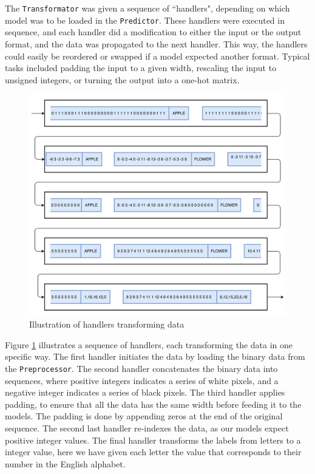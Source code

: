 The {\tt Transformator} was given a sequence of ``handlers", depending on which model was to be loaded in the {\tt Predictor}. These handlers were executed in sequence, and each handler did a modification to either the input or the output format, and the data was propagated to the next handler. This way, the handlers could easily be reordered or swapped if a model expected another format. Typical tasks included padding the input to a given width, rescaling the input to unsigned integers, or turning the output into a one-hot matrix.

\begin{figure}[h]
    \centering
    \includegraphics[width=1\textwidth]{fig/development_process/transformator.png}
    \caption{Illustration of handlers transforming data}
    \label{fig:development-transformator}
\end{figure}

Figure \ref{fig:development-transformator} illustrates a sequence of handlers, each transforming the data in one specific way. The first handler initiates the data by loading the binary data from the {\tt Preprocessor}. The second handler concatenates the binary data into sequences, where positive integers indicates a series of white pixels, and a negative integer indicates a series of black pixels. The third handler applies padding, to ensure that all the data has the same width before feeding it to the models. The padding is done by appending zeros at the end of the original sequence. The second last handler re-indexes the data, as our models expect positive integer values. The final handler transforms the labels from letters to a integer value, here we have given each letter the value that corresponds to their number in the English alphabet.

